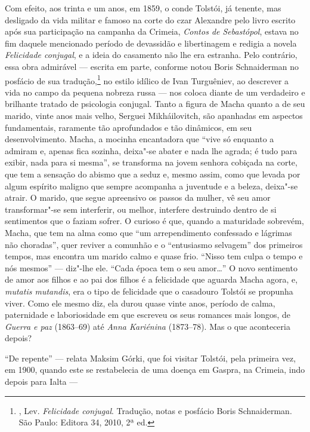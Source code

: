 Com efeito, aos trinta e um anos, em 1859, o conde Tolstói,
já tenente, mas desligado da vida militar e famoso na corte do czar
Alexandre  pelo livro escrito após sua participação na campanha da
Crimeia, \emph{Contos de Sebastópol}, estava no fim daquele mencionado período de devassidão e
libertinagem e redigia a novela \emph{Felicidade conjugal}, e a ideia do casamento
não lhe era estranha. Pelo contrário, essa obra admirável ---
escrita em parte, conforme notou Boris Schnaiderman no posfácio de
sua tradução,\footnote{, Lev. \emph{Felicidade
conjugal}. Tradução, notas e posfácio Boris Schnaiderman. São
Paulo: Editora 34, 2010, 2ª ed.} no estilo idílico de Ivan
Turguêniev, ao descrever a vida no campo da pequena nobreza russa
--- nos coloca diante de um verdadeiro e brilhante tratado de
psicologia conjugal. Tanto a figura de Macha quanto a de seu
marido, vinte anos mais velho, Serguei Mikháilovitch, são
apanhadas em aspectos fundamentais, raramente tão aprofundados e
tão dinâmicos, em seu desenvolvimento. Macha, a mocinha
encantadora que ``vive só enquanto a admiram e, apenas fica
sozinha, deixa"-se abater e nada lhe agrada; é tudo para exibir,
nada para si mesma'', se transforma na jovem senhora cobiçada na
corte, que tem a sensação do abismo que a seduz e, mesmo assim,
como que levada por algum espírito maligno que sempre acompanha a
juventude e a beleza, deixa"-se atrair. O marido, que segue
apreensivo os passos da mulher, vê seu amor transformar"-se sem
interferir, ou melhor, interfere destruindo dentro de si
sentimentos que o faziam sofrer. O curioso é que, quando a
maturidade sobrevém, Macha, que tem na alma como que ``um
arrependimento confessado e lágrimas não choradas'', quer reviver
a comunhão e o ``entusiasmo selvagem'' dos primeiros tempos, mas
encontra um marido calmo e quase frio. ``Nisso tem culpa o tempo
e nós mesmos'' --- diz"-lhe ele. ``Cada época tem o seu
amor\ldots{}'' O novo sentimento de amor aos filhos e ao pai dos
filhos é a felicidade que aguarda Macha agora, e, \emph{mutatis
mutandis}, era o tipo de felicidade que o casadouro Tolstói se
propunha viver. Como ele mesmo diz, ela durou quase vinte anos,
período de calma, paternidade e laboriosidade em que escreveu os
seus romances mais longos, de \emph{Guerra e paz} (1863--69) até
\emph{Anna Kariénina} (1873--78). Mas o que aconteceria depois?

``De repente'' --- relata Maksim Górki, que foi visitar Tolstói, pela primeira vez, em 
1900, quando este se restabelecia de uma doença em Gaspra,
na Crimeia, indo depois para Ialta ---

